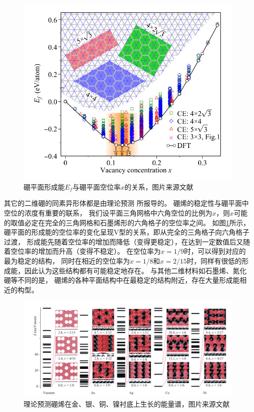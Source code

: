 \begin{figure}[tb]
  \includegraphics[width=1.0\textwidth]{figs/ch1_formation_boronphenes.png}
  \centering
  \caption{硼平面形成能$E_f$与硼平面空位率$x$的关系，图片来源文献\cite{penev2012polymorphism}}
  \label{fig:ch1_formation_boronphenes}
\end{figure}

其它的二维硼的同素异形体都是由理论预测
所报导的\cite{liu2018intermixing, liu2013probing, penev2012polymorphism, zhang2017elasticity, zhao2016superconductivity, yang2008ab, zhang2016polyphony, tsafack2016thermomechanical, zhang2016substrate, ma2016graphene}。
硼烯的稳定性与硼平面中空位的浓度有重要的联系，
我们设平面三角网格中六角空位的比例为$x$，则$x$可能的取值必定在完全的三角网格和石墨烯形的六角格子的空位率之间。
如图\ref{fig:ch1_formation_boronphenes}所示，
硼平面的形成能的空位率的变化呈现V型的关系，即从完全的三角格子向六角格子过渡，
形成能先随着空位率的增加而降低（变得更稳定），在达到一定数值后又随着空位率的增加而升高（变得不稳定）。
在空位率为$x=1/9$时\cite{penev2012polymorphism}，可以得到对应的最为稳定的结构，
同时在相近的空位率为$x=1/8$和$x=2/15$时，同样有很低的形成能，因此认为这些结构都有可能稳定地存在。
与其他二维材料如石墨烯、氮化硼等不同的是，
硼烯的各种平面结构中在最稳定的结构附近，存在大量形成能相近的构型。

\begin{figure}[tb]
  \includegraphics[width=1.0\textwidth]{figs/ch1_borophene_energy_spectra.png}
  \centering
  \caption{理论预测硼烯在金、银、铜、镍衬底上生长的能量谱，图片来源文献\cite{zhang2015two}}
  \label{fig:ch1_borophene_energy_spectra}
\end{figure}

